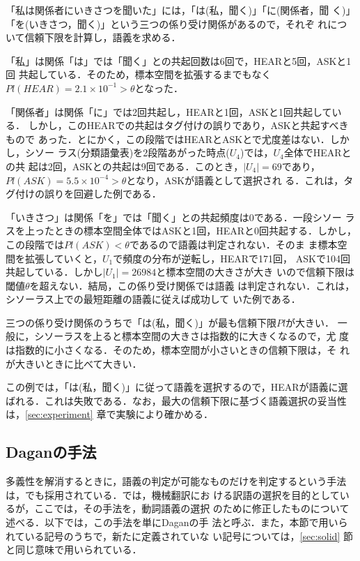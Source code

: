 「私は関係者にいきさつを聞いた」には，「は(私，聞く)」「に(関係者，聞
く)」「を(いきさつ，聞く)」という三つの係り受け関係があるので，それぞ
れについて信頼下限を計算し，語義を求める．

「私」は関係「は」では「聞く」との共起回数は6回で，HEARと5回，ASKと1回
共起している．そのため，標本空間を拡張するまでもなく$Pl(HEAR) = 2.1
\times 10^{-1} > \theta$となった．

「関係者」は関係「に」では2回共起し，HEARと1回，ASKと1回共起している．
しかし，このHEARでの共起はタグ付けの誤りであり，ASKと共起すべきもので
あった．とにかく，この段階ではHEARとASKとで尤度差はない．しかし，シソー
ラス(分類語彙表)を2段階あがった時点($U_4$)では，$U_4$全体でHEARとの共
起は2回，ASKとの共起は9回である．このとき，$|U_4| = 69$であり，
$Pl(ASK) = 5.5 \times 10^{-4} > \theta$となり，ASKが語義として選択され
る．これは，タグ付けの誤りを回避した例である．

「いきさつ」は関係「を」では「聞く」との共起頻度は0である．一段シソー
ラスを上ったときの標本空間全体ではASKと1回，HEARと0回共起する．しかし，
この段階では$Pl(ASK) < \theta$であるので語義は判定されない．そのま
ま標本空間を拡張していくと，$U_1$で頻度の分布が逆転し，HEARで171回，
ASKで104回共起している．しかし$|U_1| = 26984$と標本空間の大きさが大き
いので信頼下限は閾値$\theta$を超えない．結局，この係り受け関係では語義
は判定されない．これは，シソーラス上での最短距離の語義に従えば成功して
いた例である．

三つの係り受け関係のうちで「は(私，聞く)」が最も信頼下限$Pl$が大きい．
一般に，シソーラスを上ると標本空間の大きさは指数的に大きくなるので，尤
度は指数的に小さくなる．そのため，標本空間が小さいときの信頼下限は，そ
れが大きいときに比べて大きい．

この例では，「は(私，聞く)」に従って語義を選択するので，HEARが語義に選
ばれる．これは失敗である．なお，最大の信頼下限に基づく語義選択の妥当性
は，\ref{sec:experiment} 章で実験により確かめる．

\subsection{Daganの手法}
\label{sec:dagan}

多義性を解消するときに，語義の判定が可能なものだけを判定するという手法
は，\cite{Dagan94}でも採用されている．\cite{Dagan94}では，機械翻訳にお
ける訳語の選択を目的としているが，ここでは，その手法を，動詞語義の選択
のために修正したものについて述べる．以下では，この手法を単にDaganの手
法と呼ぶ．また，本節で用いられている記号のうちで，新たに定義されていな
い記号については，\ref{sec:solid} 節と同じ意味で用いられている．

